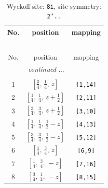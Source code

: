 \documentclass[fleqn,8pt]{jsarticle}
\begin{document}
\begin{longtable}{ccc}
\caption{Wyckoff site: {\tt 8i}, site symmetry: {\tt 2'..}}
 \\
 \hline \hline
No. & position & mapping \\ \hline \endfirsthead

\multicolumn{2}{l}{\tablename\ \thetable{}} \\
 \hline \hline
No. & position & mapping \\ \hline \endhead

 \hline \hline
\multicolumn{2}{r}{\footnotesize\it continued ...} \\ \endfoot

 \hline \hline
\multicolumn{2}{r}{} \\ \endlastfoot

1 & $\left[ \frac{3}{4},\, \frac{1}{4},\, z \right]$ & {\tt [1,14]} \\ \hline
2 & $\left[ \frac{1}{4},\, \frac{1}{4},\, z + \frac{1}{2} \right]$ & {\tt [2,11]} \\ \hline
3 & $\left[ \frac{3}{4},\, \frac{3}{4},\, z + \frac{1}{2} \right]$ & {\tt [3,10]} \\ \hline
4 & $\left[ \frac{1}{4},\, \frac{1}{4},\, \frac{1}{2} - z \right]$ & {\tt [4,13]} \\ \hline
5 & $\left[ \frac{3}{4},\, \frac{3}{4},\, \frac{1}{2} - z \right]$ & {\tt [5,12]} \\ \hline
6 & $\left[ \frac{1}{4},\, \frac{3}{4},\, z \right]$ & {\tt [6,9]} \\ \hline
7 & $\left[ \frac{1}{4},\, \frac{3}{4},\, - z \right]$ & {\tt [7,16]} \\ \hline
8 & $\left[ \frac{3}{4},\, \frac{1}{4},\, - z \right]$ & {\tt [8,15]} \\
\end{longtable}
\renewcommand{\arraystretch}{1.2}
\end{document}
